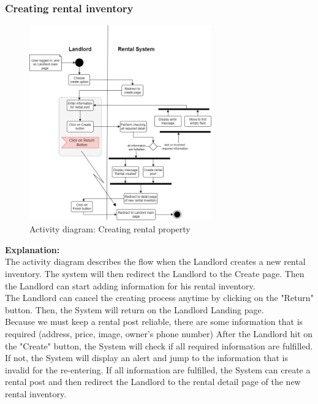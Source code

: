 \newpage
\subsubsection{Creating rental inventory}
\begin{figure}[H]
    \centering
    \includegraphics[width=0.7\textwidth]{Images/Activity/ac_diag_create_rental_post_manual.png}
    \caption{Activity diagram: Creating rental property}
    \label{fig:create-rental}
\end{figure}
\noindent \textbf{Explanation:}\\
The activity diagram describes the flow when the Landlord creates a new rental inventory. The system will then redirect the Landlord to the Create page. Then the Landlord can start adding information for his rental inventory.\\
The Landlord can cancel the creating process anytime by clicking on the "Return" button. Then, the System will return on the Landlord Landing page.\\
Because we must keep a rental post reliable, there are some information that is required (address, price, image, owner's phone number)  After the Landlord hit on the "Create" button, the System will check if all required information are fulfilled. If not, the System will display an alert and jump to the information that is invalid for the re-entering. If all information are fulfilled, the System can create a rental post and then redirect the Landlord to the rental detail page of the new rental inventory.

\newpage
